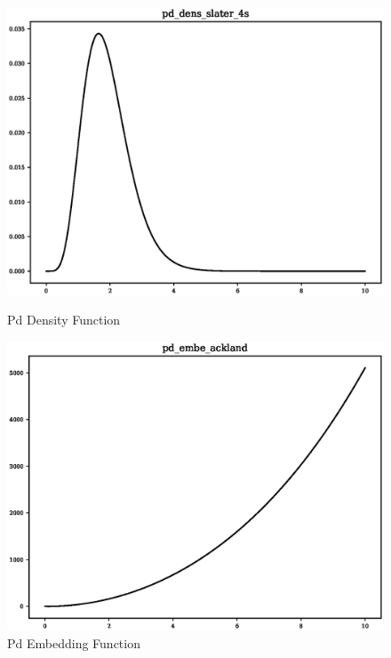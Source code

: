 \begin{figure}[ht]
\begin{minipage}[b]{0.4\linewidth}
    \includegraphics[width=.9\linewidth]{chapters/results_potential_fitting/pot_fepd_fcc_2/pd_dens_slater_4s.eps} 
    \caption{Pd Density Function} 
  \end{minipage}%
  \begin{minipage}[b]{0.4\linewidth}
    \centering
    \includegraphics[width=.9\linewidth]{chapters/results_potential_fitting/pot_fepd_fcc_2/pd_embe_ackland.eps} 
    \caption{Pd Embedding Function} 
  \end{minipage} 
  \label{fig:ironPotentialPlots} 
\end{figure}

